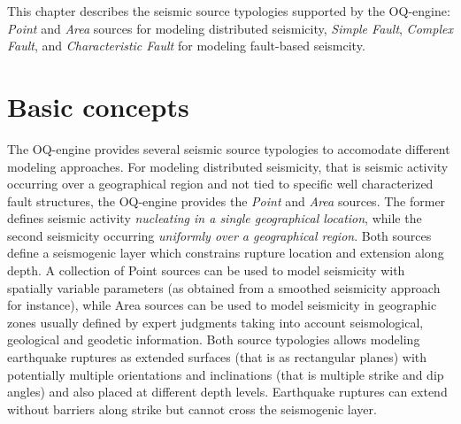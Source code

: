This chapter describes the seismic source typologies supported by the OQ-engine: \textit{Point} and
\textit{Area} sources for modeling distributed seismicity, \textit{Simple Fault}, \textit{Complex Fault}, and
\textit{Characteristic Fault} for modeling fault-based seismcity.


\section{Basic concepts}
The OQ-engine provides several seismic source typologies to accomodate different modeling approaches. For modeling distributed seismicity, that is seismic activity occurring over a geographical region and not tied to
specific well characterized fault structures, the OQ-engine provides the \textit{Point} and \textit{Area} sources. The former defines seismic activity \textit{nucleating in a single geographical location}, while the second seismicity occurring \textit{uniformly over a geographical region}. Both sources define a seismogenic layer which constrains rupture location and extension along depth. A collection of Point sources can be used to model seismicity with spatially variable parameters (as obtained from a smoothed seismicity approach for instance), while Area sources can be used to model seismicity in geographic zones usually defined by expert judgments taking into account seismological, geological and geodetic information. Both source typologies
allows modeling earthquake ruptures as extended surfaces (that is as rectangular planes) with potentially multiple orientations and inclinations (that is multiple strike and dip angles) and also placed
at different depth levels. Earthquake ruptures can extend without barriers along strike but cannot cross the seismogenic layer.

